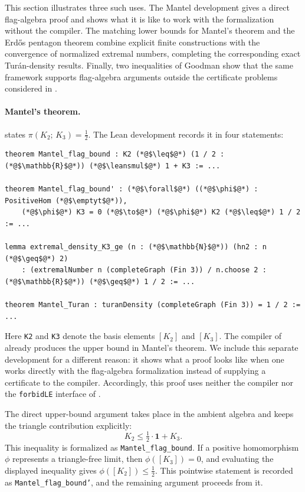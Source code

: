\documentclass{article}
\newcommand{\tdensity}[2]{\pi(#1;\,#2)}
\newcommand{\lean}[1]{\texttt{#1}}
\newcommand{\emptyt}{\emptyset_{\mathrm{t}}}
\newcommand{\leansmul}{\mathbin{\vcenter{\hbox{$\scriptstyle\bullet$}}}}
\begin{document}
This section illustrates three such uses.  The Mantel development gives a
direct flag-algebra proof and shows what it is like to work with the
formalization without the compiler.  The matching lower bounds for Mantel's
theorem and the Erd\H{o}s pentagon theorem combine explicit finite
constructions with the convergence of normalized extremal numbers, completing
the corresponding exact Tur\'an-density results.  Finally, two inequalities of
Goodman show that the same framework supports flag-algebra arguments outside
the certificate problems considered in .

\paragraph{Mantel's theorem.}
 states $\tdensity{K_2}{K_3}=\tfrac12$.  The Lean development
records it in four statements:
\begin{lstlisting}
theorem Mantel_flag_bound : K2 (*@$\leq$@*) (1 / 2 : (*@$\mathbb{R}$@*)) (*@$\leansmul$@*) 1 + K3 := ...

theorem Mantel_flag_bound' : (*@$\forall$@*) ((*@$\phi$@*) : PositiveHom (*@$\emptyt$@*)),
    (*@$\phi$@*) K3 = 0 (*@$\to$@*) (*@$\phi$@*) K2 (*@$\leq$@*) 1 / 2 := ...

lemma extremal_density_K3_ge (n : (*@$\mathbb{N}$@*)) (hn2 : n (*@$\geq$@*) 2)
    : (extremalNumber n (completeGraph (Fin 3)) / n.choose 2 : (*@$\mathbb{R}$@*)) (*@$\geq$@*) 1 / 2 := ...

theorem Mantel_Turan : turanDensity (completeGraph (Fin 3)) = 1 / 2 := ...
\end{lstlisting}
Here \lean{K2} and \lean{K3} denote the basis elements $[K_2]$ and $[K_3]$.
The compiler of  already produces the upper bound in
Mantel's theorem.  We include this separate development for a different
reason: it shows what a proof looks like when one works directly with the
flag-algebra formalization instead of supplying a certificate to the compiler.
Accordingly, this proof uses neither the compiler nor the
\lean{forbidLE} interface of .

The direct upper-bound argument takes place in the ambient algebra and keeps
the triangle contribution explicitly:
\[
  K_2\leq\tfrac12\cdot\mathbf{1}+K_3.
\]
This inequality is formalized as \lean{Mantel\_flag\_bound}.  If a positive
homomorphism $\phi$ represents a triangle-free limit, then
$\phi([K_3])=0$, and evaluating the displayed inequality gives
$\phi([K_2])\leq\tfrac12$.  This pointwise statement is recorded as
\lean{Mantel\_flag\_bound'}, and the remaining argument proceeds from it.
\end{document}
